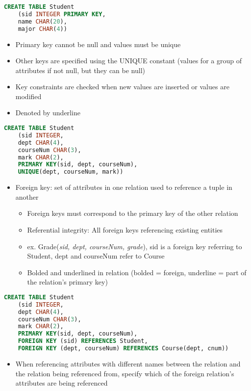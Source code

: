 \documentclass[8pt,landscape,a4paper, fleqn, dvipsnames]{extarticle}
\begin{document}
\begin{multicols*}{4}
\begin{itemize}
\end{itemize}
\begin{lstlisting}[language = SQL]
CREATE TABLE Student
    (sid INTEGER PRIMARY KEY,
    name CHAR(20),
    major CHAR(4))
\end{lstlisting}
\begin{itemize}
    \item Primary key cannot be null and values must be unique
    \item Other keys are specified using the UNIQUE constant (values for a group of attributes if not null, but they can be null)
    \item Key constraints are checked when new values are inserted or values are modified
    \item Denoted by underline
\end{itemize}
\begin{lstlisting}[language = SQL]
CREATE TABLE Student
    (sid INTEGER,
    dept CHAR(4),
    courseNum CHAR(3),
    mark CHAR(2),
    PRIMARY KEY(sid, dept, courseNum),
    UNIQUE(dept, courseNum, mark))
\end{lstlisting}
\begin{itemize}
    \item Foreign key: set of attributes in one relation used to reference a tuple in another
    \begin{itemize}
        \item Foreign keys must correspond to the primary key of the other relation
        \item Referential integrity: All foreign keys referencing existing entities
        \item ex. Grade(\textit{sid, dept, courseNum, grade}), sid is a foreign key referring to Student, dept and courseNum refer to Course
        \item Bolded and underlined in relation (bolded = foreign, underline = part of the relation's primary key)
    \end{itemize}
\end{itemize}
\begin{lstlisting}[language = SQL]
CREATE TABLE Student
    (sid INTEGER,
    dept CHAR(4),
    courseNum CHAR(3),
    mark CHAR(2),
    PRIMARY KEY(sid, dept, courseNum),
    FOREIGN KEY (sid) REFERENCES Student,
    FOREIGN KEY (dept, courseNum) REFERENCES Course(dept, cnum))
\end{lstlisting}
\begin{itemize}
    \item When referencing attributes with different names between the relation and the relation being referenced from, specify which of the foreign relation's attributes are being referenced

\end{itemize}
\end{multicols*}
\end{document}
